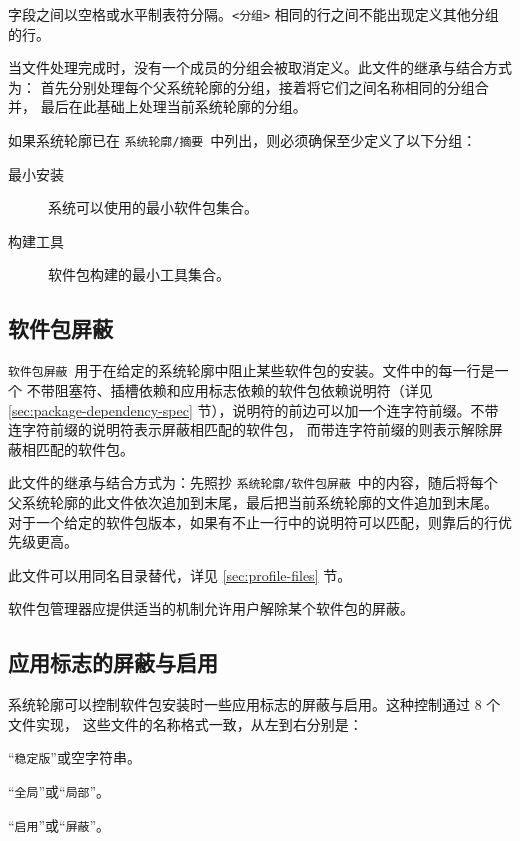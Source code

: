字段之间以空格或水平制表符分隔。\texttt{<\hspace{0em}分组\hspace{0em}>}
相同的行之间不能出现定义其他分组的行。

当文件处理完成时，没有一个成员的分组会被取消定义。此文件的继承与结合方式为：
首先分别处理每个父系统轮廓的分组，接着将它们之间名称相同的分组合并，
最后在此基础上处理当前系统轮廓的分组。

如果系统轮廓已在 \texttt{系统轮廓/摘要}\ 中列出，则必须确保至少定义了以下分组：
\begin{description}
\item[最小安装] 系统可以使用的最小软件包集合。
\item[构建工具] 软件包构建的最小工具集合。
\end{description}

\subsection{软件包屏蔽}
\texttt{软件包屏蔽}\ 用于在给定的系统轮廓中阻止某些软件包的安装。文件中的每一行是一个
不带阻塞符、插槽依赖和应用标志依赖的软件包依赖说明符（详见 \ref{sec:package-dependency-spec}
节），说明符的前边可以加一个连字符前缀。不带连字符前缀的说明符表示屏蔽相匹配的软件包，
而带连字符前缀的则表示解除屏蔽相匹配的软件包。

此文件的继承与结合方式为：先照抄 \texttt{系统轮廓/软件包屏蔽}\ 中的内容，随后将每个
父系统轮廓的此文件依次追加到末尾，最后把当前系统轮廓的文件追加到末尾。
对于一个给定的软件包版本，如果有不止一行中的说明符可以匹配，则靠后的行优先级更高。

此文件可以用同名目录替代，详见 \ref{sec:profile-files} 节。

软件包管理器应提供适当的机制允许用户解除某个软件包的屏蔽。

\subsection{应用标志的屏蔽与启用}
\label{sec:use-masking}
系统轮廓可以控制软件包安装时一些应用标志的屏蔽与启用。这种控制通过 8 个文件实现，
这些文件的名称格式一致，从左到右分别是：
\begin{compactitem}
\item “\texttt{稳定版}”或空字符串。
\item “\texttt{全局}”或“\texttt{局部}”。
\item “\texttt{启用}”或“\texttt{屏蔽}”。
\end{compactitem}

